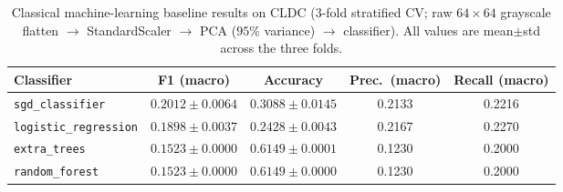 \begin{table}[t]
\centering
\caption{Classical machine-learning baseline results on CLDC (3-fold stratified CV; raw $64{\times}64$ grayscale flatten $\rightarrow$ StandardScaler $\rightarrow$ PCA ($95\%$ variance) $\rightarrow$ classifier). All values are mean$\pm$std across the three folds.}
\label{tab:results_ml}
\renewcommand{\arraystretch}{1.25}
\setlength{\tabcolsep}{4pt}
\begin{tabular}{lcccc}
\toprule
\textbf{Classifier} & \textbf{F1 (macro)} & \textbf{Accuracy} & \textbf{Prec.\ (macro)} & \textbf{Recall (macro)} \\
\midrule
\texttt{sgd\_classifier} & $0.2012 \pm 0.0064$ & $0.3088 \pm 0.0145$ & 0.2133 & 0.2216 \\
\texttt{logistic\_regression} & $0.1898 \pm 0.0037$ & $0.2428 \pm 0.0043$ & 0.2167 & 0.2270 \\
\texttt{extra\_trees} & $0.1523 \pm 0.0000$ & $0.6149 \pm 0.0001$ & 0.1230 & 0.2000 \\
\texttt{random\_forest} & $0.1523 \pm 0.0000$ & $0.6149 \pm 0.0000$ & 0.1230 & 0.2000 \\
\bottomrule
\end{tabular}
\end{table}
